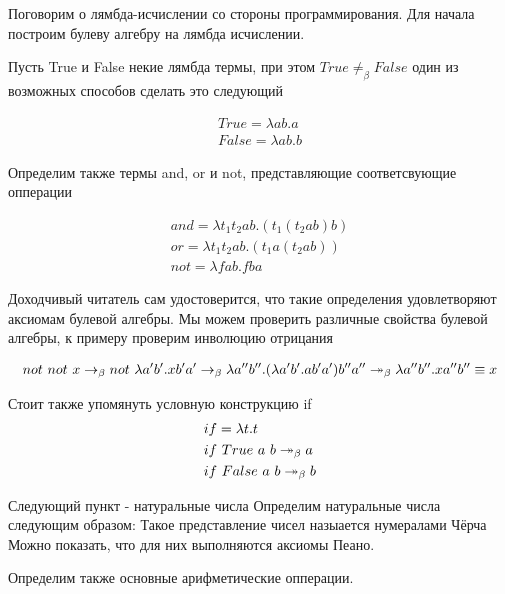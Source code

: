 \documentclass[lambda.tex]{subfiles}
\begin{document}
Поговорим о лямбда-исчислении со стороны программирования. Для начала построим булеву алгебру на лямбда исчислении.

Пусть True и False некие лямбда термы, при этом $True \neq_\beta False$ один из возможных способов сделать это следующий

\begin{align*}
True = \lambda a b.a\\
False = \lambda a b.b
\end{align*}

Определим также термы and, or и not, представляющие соответсвующие опперации

\begin{align*}
and = \lambda t_1 t_2 a b . (t_1 (t_2 a b) b)\\
or = \lambda t_1 t_2 a b.(t_1 a (t_2 a b))\\
not = \lambda f a b . f b a
\end{align*}

Доходчивый читатель сам удостоверится, что такие определения удовлетворяют аксиомам булевой алгебры.
Мы можем проверить различные свойства булевой алгебры, к примеру проверим инволюцию отрицания

\begin{align*}
	not\ not\ x \rightarrow_\beta
	not\ \lambda a' b' . x b' a' \rightarrow_\beta
	\lambda a'' b'' . (\lambda a' b' . a b' a') b'' a'' \twoheadrightarrow_\beta
	\lambda a'' b'' . x a'' b'' \equiv x
\end{align*}

Стоит также упомянуть условную конструкцию if
\begin{align*}
&if = \lambda t. t\\
&if\ True\ a\ b \twoheadrightarrow_\beta a\\
&if\ False\ a\ b \twoheadrightarrow_\beta b\\
\end{align*}

Следующий пункт - натуральные числа
Определим натуральные числа следующим образом:
Такое представление чисел назыается нумералами Чёрча
Можно показать, что для них выполняются аксиомы Пеано.

Определим также основные арифметические опперации. 

\end{document}
